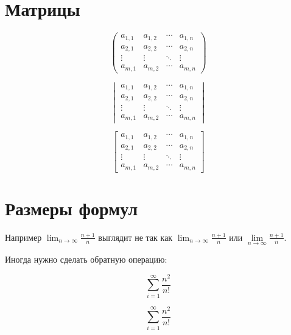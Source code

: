 \documentclass[12pt, a4paper]{article}
\begin{document}
\section{Матрицы}

\[
 \begin{pmatrix}
  a_{1,1} & a_{1,2} & \cdots & a_{1,n} \\
  a_{2,1} & a_{2,2} & \cdots & a_{2,n} \\
  \vdots  & \vdots  & \ddots & \vdots  \\
  a_{m,1} & a_{m,2} & \cdots & a_{m,n}
 \end{pmatrix}
\]

\[
 \begin{vmatrix}
  a_{1,1} & a_{1,2} & \cdots & a_{1,n} \\
  a_{2,1} & a_{2,2} & \cdots & a_{2,n} \\
  \vdots  & \vdots  & \ddots & \vdots  \\
  a_{m,1} & a_{m,2} & \cdots & a_{m,n}
 \end{vmatrix}
\]

\[
 \begin{bmatrix}
  a_{1,1} & a_{1,2} & \cdots & a_{1,n} \\
  a_{2,1} & a_{2,2} & \cdots & a_{2,n} \\
  \vdots  & \vdots  & \ddots & \vdots  \\
  a_{m,1} & a_{m,2} & \cdots & a_{m,n}
 \end{bmatrix}
\]



\section{Размеры формул}


Например $\lim_{n \to \infty} \frac{n+1}{n}$ выглядит не так как $\displaystyle \lim_{n \to \infty} \frac{n+1}{n}$ или $\lim\limits_{n \to \infty} \frac{n+1}{n}$.

Иногда нужно сделать обратную операцию:

\[\sum_{i=1}^{\infty} \frac{n^2}{n!} \]

\[\textstyle \sum_{i=1}^{\infty} \frac{n^2}{n!} \]
\end{document}
